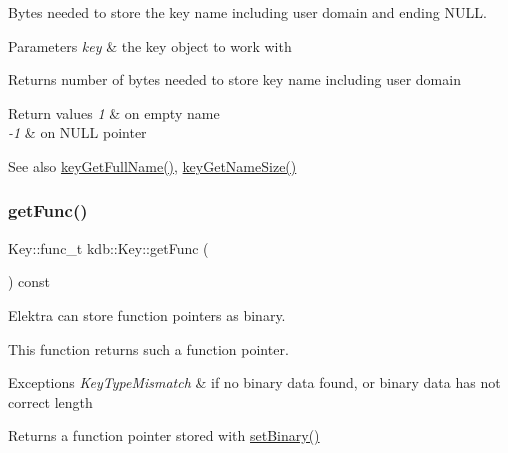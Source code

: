 Bytes needed to store the key name including user domain and ending N\+U\+LL. 


\begin{DoxyParams}{Parameters}
{\em key} & the key object to work with \\
\hline
\end{DoxyParams}
\begin{DoxyReturn}{Returns}
number of bytes needed to store key name including user domain 
\end{DoxyReturn}

\begin{DoxyRetVals}{Return values}
{\em 1} & on empty name \\
\hline
{\em -\/1} & on N\+U\+LL pointer \\
\hline
\end{DoxyRetVals}
\begin{DoxySeeAlso}{See also}
\hyperlink{group__keyname_gaaba1494a5ffc976e0e56c43f4334a23c}{key\+Get\+Full\+Name()}, \hyperlink{group__keyname_gabdbcfa51ed8a387e47ead207affa2d2e}{key\+Get\+Name\+Size()} 
\end{DoxySeeAlso}
\mbox{\label{classkdb_1_1Key_aa9643866a567ba5f012a3e9ab2a91721}} 
\subsubsection{\texorpdfstring{get\+Func()}{getFunc()}}
{\footnotesize\ttfamily Key\+::func\+\_\+t kdb\+::\+Key\+::get\+Func (\begin{DoxyParamCaption}{ }\end{DoxyParamCaption}) const\hspace{0.3cm}{\ttfamily [inline]}}



Elektra can store function pointers as binary. 

This function returns such a function pointer.


\begin{DoxyExceptions}{Exceptions}
{\em Key\+Type\+Mismatch} & if no binary data found, or binary data has not correct length\\
\hline
\end{DoxyExceptions}
\begin{DoxyReturn}{Returns}
a function pointer stored with \hyperlink{classkdb_1_1Key_af7211129a4b95f4d1e335dcd06e9bf0a}{set\+Binary()} 
\end{DoxyReturn}
\mbox{\label{classkdb_1_1Key_a6be9b3bb17434fd4362d137183d51100}} 
